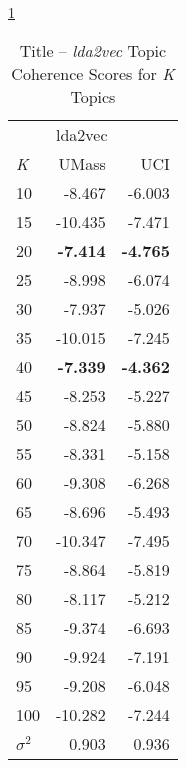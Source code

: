 \documentclass[letterpaper,12pt]{article}
\begin{document}
\ref{tab:lda2vec_title_tc}
\begin{table}
	\caption{\label{tab:lda2vec_title_tc} Title -- \emph{lda2vec} Topic Coherence Scores for \emph{K} Topics}
	\begin{center}
		\begin{tabular}{lrr}
			\toprule
			{} & \multicolumn{2}{l}{lda2vec} \\
			\emph{K} &   UMass &    UCI \\
			\midrule
			10  &  -8.467 & -6.003 \\
			15  & -10.435 & -7.471 \\
			20  &  \textbf{-7.414} & \textbf{-4.765} \\
			25  &  -8.998 & -6.074 \\
			30  &  -7.937 & -5.026 \\
			35  & -10.015 & -7.245 \\
			40  &  \textbf{-7.339} & \textbf{-4.362} \\
			45  &  -8.253 & -5.227 \\
			50  &  -8.824 & -5.880 \\
			55  &  -8.331 & -5.158 \\
			60  &  -9.308 & -6.268 \\
			65  &  -8.696 & -5.493 \\
			70  & -10.347 & -7.495 \\
			75  &  -8.864 & -5.819 \\
			80  &  -8.117 & -5.212 \\
			85  &  -9.374 & -6.693 \\
			90  &  -9.924 & -7.191 \\
			95  &  -9.208 & -6.048 \\
			100 & -10.282 & -7.244 \\
			\midrule
			$\sigma^2$ & 0.903 & 0.936 \\
			\bottomrule
			\end{tabular}
	\end{center}
\end{table}
\end{document}
